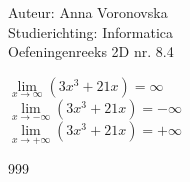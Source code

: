 \documentclass[a4paper]{article}
\begin{document}
\noindent \large Auteur: Anna Voronovska \\
\noindent \large Studierichting: Informatica \\
\noindent \large Oefeningenreeks 2D nr. 8.4 \\

\bigskip 

\normalsize

$\lim\limits_{x \to \infty} (3x^3+ 21x) = \infty$\\

$\lim\limits_{x \to -\infty} (3x^3+ 21x) = -\infty$\\

$\lim\limits_{x \to +\infty} (3x^3+ 21x) = +\infty$\\

\begin{thebibliography}{999}
\end{thebibliography}
\end{document}
